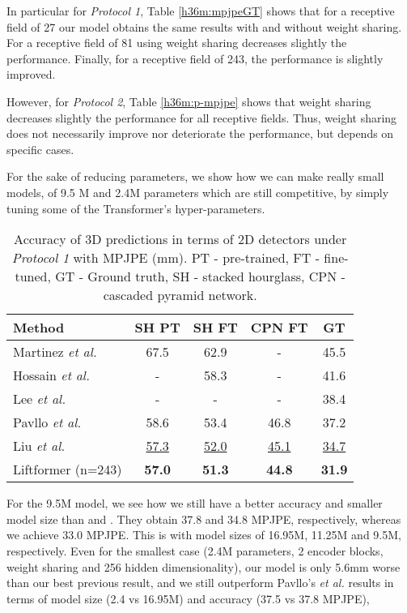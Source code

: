 \documentclass[letterpaper]{article}
\begin{document}
In particular for \textit{Protocol 1}, Table \ref{h36m:mpjpeGT} shows that for a receptive field of 27 our model obtains the same results with and without weight sharing. For a receptive field of 81 using weight sharing decreases slightly the performance. Finally, for a receptive field of 243, the performance is slightly improved. 

However, for \textit{Protocol 2}, Table \ref{h36m:p-mpjpe} shows that weight sharing decreases slightly the performance for all receptive fields. Thus, weight sharing does not necessarily improve nor deteriorate the performance, but depends on specific cases.

For the sake of reducing parameters, we show how we can make really small models, of 9.5 M and 2.4M parameters which are still competitive, by simply tuning some of the Transformer's hyper-parameters. 

\begin{table}[t]
\begin{adjustbox}{width=1\columnwidth}
\begin{tabular}{l|c|c|c|c}
Method & SH PT & SH FT & CPN FT & GT\\
\hline
Martinez \textit{et al.} \cite{martinez17} & 67.5 & 62.9 & - & 45.5 \\
Hossain \textit{et al.} \cite{hossain18} & - & 58.3 & - & 41.6 \\
Lee \textit{et al.} \cite{lee18} & - & - & - & 38.4 \\
Pavllo \textit{et al.} \cite{pavllo19} & 58.6 & 53.4 & 46.8 & 37.2\\
Liu \textit{et al.} \cite{liu20} & \underline{57.3} & \underline{52.0} & \underline{45.1} & \underline{34.7}\\
Liftformer (n=243) & \textbf{57.0} & \textbf{51.3} & \textbf{44.8} & \textbf{31.9}\\
\end{tabular}
\end{adjustbox}
\caption{Accuracy of 3D predictions in terms of 2D detectors under \textit{Protocol 1} with MPJPE (mm). PT - pre-trained, FT - fine-tuned, GT - Ground truth, SH - stacked hourglass, CPN - cascaded pyramid network.}
\label{ablat:detectors}
\end{table}

For the 9.5M model, we see how we still have a better accuracy and smaller model size than \cite{pavllo19} and \cite{liu20}. They obtain 37.8 and 34.8 MPJPE, respectively, whereas we achieve 33.0 MPJPE. This is with model sizes of 16.95M, 11.25M and 9.5M, respectively. Even for the smallest case (2.4M parameters, 2 encoder blocks, weight sharing and 256 hidden dimensionality), our model is only 5.6mm worse than our best previous result, and we still outperform Pavllo's \textit{et al.} \cite{pavllo19} results in terms of model size (2.4 vs 16.95M) and accuracy (37.5 vs 37.8 MPJPE),
\end{document}
